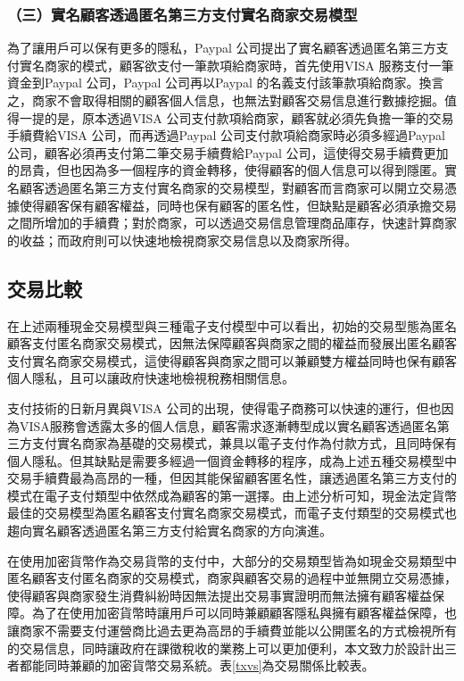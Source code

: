 		\subsubsection{（三）實名顧客透過匿名第三方支付實名商家交易模型}
		為了讓用戶可以保有更多的隱私，Paypal 公司提出了實名顧客透過匿名第三⽅⽀付實名商家的模式，顧客欲⽀付⼀筆款項給商家時，⾸先使⽤VISA 服務⽀付⼀筆資⾦到Paypal 公司，Paypal 公司再以Paypal 的名義⽀付該筆款項給商家。換⾔之，商家不會取得相關的顧客個⼈信息，也無法對顧客交易信息進⾏數據挖掘。值得⼀提的是，原本透過VISA 公司⽀付款項給商家，顧客就必須先負擔一筆的交易⼿續費給VISA 公司，而再透過Paypal 公司⽀付款項給商家時必須多經過Paypal 公司，顧客必須再⽀付第二筆交易⼿續費給Paypal 公司，這使得交易⼿續費更加的昂貴，但也因為多⼀個程序的資⾦轉移，使得顧客的個⼈信息可以得到隱匿。實名顧客透過匿名第三⽅⽀付實名商家的交易模型，對顧客⽽⾔商家可以開⽴交易憑據使得顧客保有顧客權益，同時也保有顧客的匿名性，但缺點是顧客必須承擔交易之間所增加的⼿續費；對於商家，可以透過交易信息管理商品庫存，快速計算商家的收益；而政府則可以快速地檢視商家交易信息以及商家所得。

		\subsection{交易比較}


		在上述兩種現金交易模型與三種電子支付模型中可以看出，初始的交易型態為匿名顧客⽀付匿名商家交易模式，因無法保障顧客與商家之間的權益而發展出匿名顧客⽀付實名商家交易模式，這使得顧客與商家之間可以兼顧雙⽅權益同時也保有顧客個⼈隱私，且可以讓政府快速地檢視稅務相關信息。

		⽀付技術的⽇新⽉異與VISA 公司的出現，使得電⼦商務可以快速的運⾏，但也因為VISA服務會透露太多的個⼈信息，顧客需求逐漸轉型成以實名顧客透過匿名第三⽅⽀付實名商家為基礎的交易模式，兼具以電⼦⽀付作為付款⽅式，且同時保有個⼈隱私。但其缺點是需要多經過⼀個資金轉移的程序，成為上述五種交易模型中交易手續費最為高昂的一種，但因其能保留顧客匿名性，讓透過匿名第三⽅⽀付的模式在電子支付類型中依然成為顧客的第一選擇。由上述分析可知，現⾦法定貨幣最佳的交易模型為匿名顧客⽀付實名商家交易模式，⽽電⼦⽀付類型的交易模式也趨向實名顧客透過匿名第三方支付給實名商家的方向演進。

		在使用加密貨幣作為交易貨幣的⽀付中，⼤部分的交易類型皆為如現⾦交易類型中匿名顧客⽀付匿名商家的交易模式，商家與顧客交易的過程中並無開⽴交易憑據，使得顧客與商家發⽣消費糾紛時因無法提出交易事實證明而無法擁有顧客權益保障。為了在使用加密貨幣時讓用戶可以同時兼顧顧客隱私與擁有顧客權益保障，也讓商家不需要⽀付運營商比過去更為高昂的⼿續費並能以公開匿名的⽅式檢視所有的交易信息，同時讓政府在課徵稅收的業務上可以更加便利，本⽂致⼒於設計出三者都能同時兼顧的加密貨幣交易系統。表\ref{txvs}為交易關係⽐較表。


